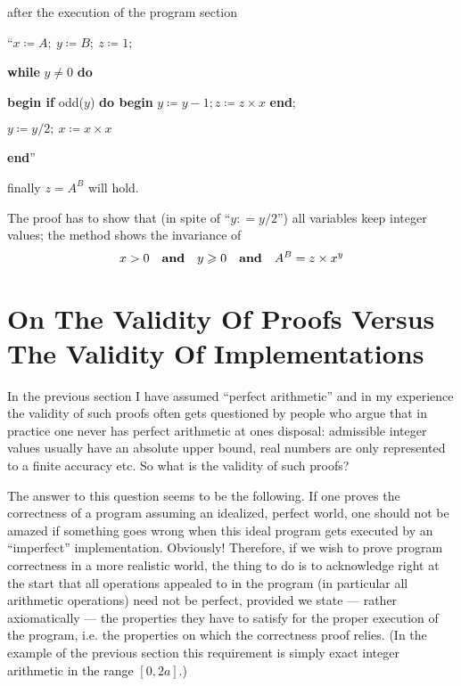 \begin{enumerate}[leftmargin=*, itemindent=3\parindent, label=\textit{Remark }\arabic*.]
	after the execution of the program section
	
	{
		\setlength{\parindent}{8em}
		\hspace{-.4em}``$x \coloneq A;\ y \coloneq B;\ z \coloneq 1;$
		
		\textbf{while} $y \neq 0$ \textbf{do}
		
		\quad\textbf{begin if} odd($y$) \textbf{do begin} $y \coloneq y - 1; z \coloneq z \times x$ \textbf{end};
		
		\quad\quad $y \coloneq y/2;\ x \coloneq x \times x$
		
		\quad\textbf{end}''
	}
	
	finally $z = A^B$ will hold.
\end{enumerate}


The proof has to show that (in spite of ``$y: = y/2$'') all variables keep integer values; the method shows the invariance of
$$
x > 0\quad \text{\textbf{and}}\quad y \geqslant 0\quad \text{\textbf{and}}\quad A^B = z \times x^y
$$

\section[On the validity of proofs versus the validity of implementations]{On The Validity Of Proofs Versus The Validity Of Implementations}

In the previous section I have assumed ``perfect arithmetic'' and in my experience the validity of such proofs often gets questioned by people who argue that in practice one never has perfect arithmetic at ones disposal: admissible integer values usually have an absolute upper bound, real numbers are only represented to a finite accuracy etc. So what is the validity of such proofs?

The answer to this question seems to be the following. If one proves the correctness of a program assuming an idealized, perfect world, one should not be amazed if something goes wrong when this ideal program gets executed by an ``imperfect'' implementation. Obviously! Therefore, if we wish to prove program correctness in a more realistic world, the thing to do is to acknowledge right at the start that all operations appealed to in the program (in particular all arithmetic operations) need not be perfect, provided we state --- rather axiomatically --- the properties they have to satisfy for the proper execution of the program, i.e. the properties on which the correctness proof relies. (In the example of the previous section this requirement is simply exact integer arithmetic in the range $[0, 2a]$.)

